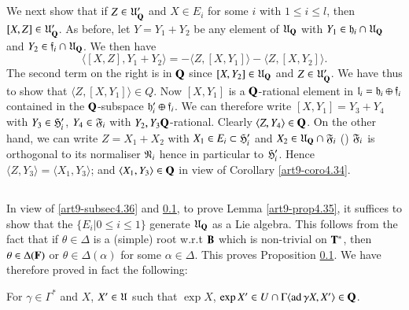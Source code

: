 \subsection{}\label{art9-subsec4.37}
We next show that if $Z \in \mathfrak{U}'_{\mathbf{Q}}$ and $X \in E_i$ for some $i$ with $1 \leqslant i \leqslant l$, then $[X, Z] \in \mathfrak{U}'_{\mathbf{Q}}$. As before, let $Y = Y_1 + Y_2$ be any element of $\mathfrak{U}_{\mathbf{Q}}$ with $Y_1 \in \mathfrak{h}_i \cap \mathfrak{U}_{\mathbf{Q}}$ and $Y_2 \in \mathfrak{f}_i \cap \mathfrak{U}_{\mathbf{Q}}$. We then have 
$$
\langle [X, Z], Y_1 + Y_2 \rangle  = - \langle Z, [X, Y_1]  \rangle - \langle Z , [X, Y_2]\rangle .
$$
The second term on the right is in $\mathbf{Q}$ since $[X, Y_2] \in \mathfrak{U}_{\mathbf{Q}}$ and $Z \in \mathfrak{U}'_{\mathbf{Q}}$. We have thus to show that $\langle Z, [X, Y_1] \rangle \in Q$. Now $[X, Y_1]$ is a $\mathbf{Q}$-rational element in $\mathfrak{l}_i = \mathfrak{h}_i \oplus \mathfrak{f}_i$ contained in the $\mathbf{Q}$-subspace $\mathfrak{h}'_i \oplus \mathfrak{f}_i$. We can therefore write $[X, Y_1] = Y_3 + Y_4$ with $Y_3 \in \mathfrak{H}'_i$, $Y_4 \in\mathfrak{F}_i$ with $Y_2 , Y_3 \mathbf{Q}$-rational. Clearly $\langle Z, Y_4 \rangle \in \mathbf{Q}$. On the other hand, we can write $Z = X_1 + X_2$ with $X_1 \in E_i \subset \mathfrak{H}'_i$ and $X_2 \in \mathfrak{U}_{\mathbf{Q}} \cap \mathfrak{F}_i$ () $\mathfrak{F}_i$ is orthogonal to its normaliser $\mathfrak{N}_i$ hence in particular to $\mathfrak{H}'_i$. Hence $\langle Z, Y_3 \rangle = \langle X_1, Y_3\rangle$; and $\langle X_1, Y_3\rangle  \in \mathbf{Q}$ in view of Corollary \ref{art9-coro4.34}.

\subsection{}\label{art9-subsec4.38}
In view of \ref{art9-subsec4.36} and \ref{art9-subsec4.37}, to prove Lemma \ref{art9-prop4.35}, it suffices to show that the $\{E_i \big| 0 \leqslant i \leqslant 1\}$ generate $\mathfrak{U}_{\mathbf{Q}}$ as a Lie algebra. This follows from the fact that if $\theta \in \Delta$ is a (simple) root w.r.t $\mathbf{B}$ which is non-trivial on $\mathbf{T}^\ast$, then $\theta \in\Delta (\mathbf{F})$ or $\theta \in \Delta (\alpha)$ for some $\alpha \in \Delta$. This proves Proposition \ref{art9-subsec4.37}. We have therefore proved in fact the following:

\begin{proposition}\label{art9-prop4.39}
For $\gamma \in \Gamma^\ast$ and $X$, $X' \in \mathfrak{U}$ such that $\exp X$, $\exp X' \in U \cap \Gamma \langle \operatorname{ad} \gamma X, X' \rangle \in \mathbf{Q}$.
\end{proposition}

